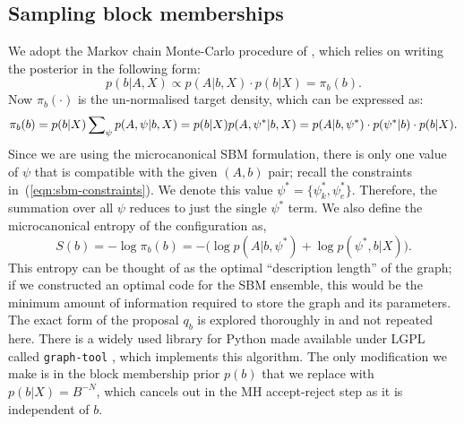 \FloatBarrier
\subsection{Sampling block memberships}

We adopt the Markov chain Monte-Carlo procedure of
\cite{Peixoto-MCMC},
which relies on writing the posterior in the following form:
%
\begin{equation}
	p(b | A, X) \propto p(A | b, X) \cdot p(b | X) = \pi_b(b).
\end{equation}
%
Now $\pi_b(\cdot)$ is the un-normalised target density,
which can be expressed as:
%
\begin{equation}
	\pi_b(b) = p(b|X) \sum_{\psi} \nolimits p(A , \psi | b, X) \\
	= p(b|X) p(A, \psi^* | b, X) \\
	= p(A | b, \psi^*) \cdot p(\psi^* | b) \cdot p(b | X).
\end{equation}
%
Since we are using the microcanonical SBM formulation, there is only one 
value of $\psi$ that is compatible with the given $(A, b)$ pair;
recall the constraints in~(\ref{eqn:sbm-constraints}). 
We denote this value $\psi^* = \{\psi_k^*, \psi_e^*\}$. Therefore, 
the summation over all $\psi$ reduces to just the single $\psi^*$ term.
We also define the microcanonical entropy of the configuration as,
%
\begin{equation}
	S(b) = - \log \pi_b(b) = - \Big( \log p(A | b, \psi^*) + \log p(\psi^*, b | X) \Big).
	\label{eqn:dl-form}
\end{equation}
%
This entropy can be thought of as the optimal
``description length'' of the graph; if we 
constructed an optimal code for the SBM ensemble,
this would be the minimum amount of information 
required to store the graph and its parameters. 
The exact form of the proposal $q_b$ is explored thoroughly in
\cite{Peixoto-MCMC} and not repeated here. There is a widely used 
library for Python made available under LGPL 
called \verb*|graph-tool| \cite{peixoto_graph-tool_2014}, 
which implements this algorithm. The only modification we make is in 
the block membership prior $p(b)$ that we replace with $p(b|X)=B^{-N}$, 
which cancels out in the MH accept-reject step as it is independent of $b$.

